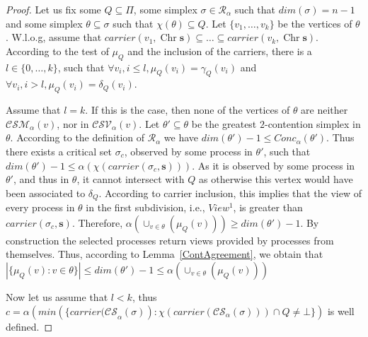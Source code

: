 \documentclass[a4paper]{article}
\def\R{\ensuremath{\mathcal{R}}}
\def\s {\mathbf{s}}
\def\Chr{\operatorname{Chr}}
\def\Car{\mathit{carrier}}
\begin{document}
\muQAg*

\begin{proof}
Let us fix some $Q\subseteq \Pi$, some simplex $\sigma\in\R_\alpha$ such that $\mathit{dim}(\sigma)=n-1$
and some simplex $\theta\subseteq\sigma$ such that $\chi(\theta)\subseteq Q$. 
Let $\{v_1,\dots,v_k\}$ be the vertices of $\theta$.
W.l.o.g, assume that $\Car(v_1,\Chr\s)\subseteq\dots\subseteq \Car(v_k,\Chr\s)$.
According to the test of $\mu_Q$ and the inclusion of the carriers, there is a $l\in\{0,\dots,k\}$,
such that $\forall v_i, i\leq l, \mu_Q(v_i)=\gamma_Q(v_i)$ and $\forall v_i, i> l, \mu_Q(v_i)=\delta_Q(v_i)$. 

Assume that $l=k$. If this is the case,
then none of the vertices of $\theta$ are neither $\mathcal{CSM}_\alpha(v)$, nor in $\mathcal{CSV}_\alpha(v)$. Let $\theta'\subseteq\theta$ be the greatest $2$-contention simplex in $\theta$. According to the definition of $\R_\alpha$ we have $\mathit{dim}(\theta')-1\leq\mathit{Conc}_\alpha(\theta')$. 
Thus there exists a critical set $\sigma_c$, observed by some process in $\theta'$, such that $\mathit{dim}(\theta')-1\leq\alpha(\chi(\Car(\sigma_c,\s)))$. As it is observed by some process in
$\theta'$, and thus in $\theta$, it cannot intersect with $Q$ as otherwise this vertex would have been 
associated to $\delta_Q$. According to carrier inclusion, this implies that the view of every process in
$\theta$ in the first subdivision, i.e., $View^1$, is greater than $\Car(\sigma_c,\s)$.
Therefore, $\alpha(\cup_{v\in\theta}(\mu_Q(v)))\geq {dim}(\theta')-1$. 
By construction the selected processes return views provided by processes from themselves. Thus, according to Lemma~\ref{ContAgreement}, we obtain that 
$|\{\mu_Q(v):v\in\theta\}|\leq \mathit{dim}(\theta')-1 \leq \alpha(\cup_{v\in\theta}(\mu_Q(v)))$

Now let us assume that $l<k$, thus $c = \alpha(min(\{{\Car(\mathcal{CS}}_\alpha(\sigma)):\chi(\Car({\mathcal{CS}}_\alpha(\sigma)))\cap Q\neq\bot\})$ is well defined. 


\end{proof}
\end{document}
